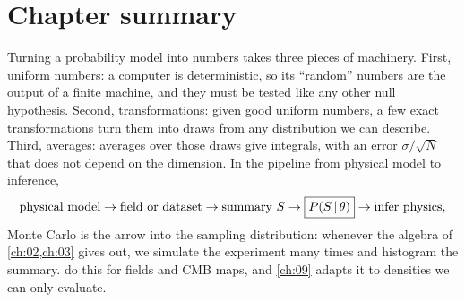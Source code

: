 \section*{Chapter summary}
\label{6b:sec:summary}

Turning a probability model into numbers takes three pieces of machinery. First, uniform
numbers: a computer is deterministic, so its ``random'' numbers are the output of a finite
machine, and they must be tested like any other null hypothesis. Second, transformations:
given good uniform numbers, a few exact transformations turn them into draws from any
distribution we can describe. Third, averages: averages over those draws give integrals,
with an error $\sigma/\sqrt N$ that does not depend on the dimension. In the pipeline from
physical model to inference,
\[
  \text{physical model}\to\text{field or dataset}\to\text{summary }S\to
  \boxed{P(S\,\vert\,\theta)}\to\text{infer physics},
\]
Monte Carlo is the arrow into the sampling distribution: whenever the algebra of
\cref{ch:02,ch:03} gives out, we simulate the experiment many times and histogram the summary.
 do this for fields and CMB maps, and \cref{ch:09} adapts it to densities
we can only evaluate.

